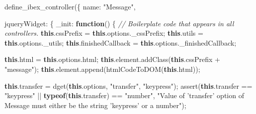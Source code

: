 \documentclass[]{article}
\newenvironment{Shaded}{}{}
\newcommand{\KeywordTok}[1]{\textcolor[rgb]{0.00,0.44,0.13}{\textbf{{#1}}}}
\newcommand{\DataTypeTok}[1]{\textcolor[rgb]{0.56,0.13,0.00}{{#1}}}
\newcommand{\StringTok}[1]{\textcolor[rgb]{0.25,0.44,0.63}{{#1}}}
\newcommand{\CommentTok}[1]{\textcolor[rgb]{0.38,0.63,0.69}{\textit{{#1}}}}
\newcommand{\OtherTok}[1]{\textcolor[rgb]{0.00,0.44,0.13}{{#1}}}
\newcommand{\FunctionTok}[1]{\textcolor[rgb]{0.02,0.16,0.49}{{#1}}}
\newcommand{\NormalTok}[1]{{#1}}
\begin{document}
\begin{Shaded}
\begin{Highlighting}[]
\FunctionTok{define_ibex_controller}\NormalTok{(\{}
\DataTypeTok{name}\NormalTok{: }\StringTok{"Message"}\NormalTok{,}

\DataTypeTok{jqueryWidget}\NormalTok{: \{}
    \DataTypeTok{_init}\NormalTok{: }\KeywordTok{function}\NormalTok{() \{}
        \CommentTok{// Boilerplate code that appears in all controllers.}
        \KeywordTok{this}\NormalTok{.}\FunctionTok{cssPrefix} \NormalTok{= }\KeywordTok{this}\NormalTok{.}\OtherTok{options}\NormalTok{.}\FunctionTok{_cssPrefix}\NormalTok{;}
        \KeywordTok{this}\NormalTok{.}\FunctionTok{utils} \NormalTok{= }\KeywordTok{this}\NormalTok{.}\OtherTok{options}\NormalTok{.}\FunctionTok{_utils}\NormalTok{;}
        \KeywordTok{this}\NormalTok{.}\FunctionTok{finishedCallback} \NormalTok{= }\KeywordTok{this}\NormalTok{.}\OtherTok{options}\NormalTok{.}\FunctionTok{_finishedCallback}\NormalTok{;}

        \KeywordTok{this}\NormalTok{.}\FunctionTok{html} \NormalTok{= }\KeywordTok{this}\NormalTok{.}\OtherTok{options}\NormalTok{.}\FunctionTok{html}\NormalTok{;}
        \KeywordTok{this}\NormalTok{.}\OtherTok{element}\NormalTok{.}\FunctionTok{addClass}\NormalTok{(}\KeywordTok{this}\NormalTok{.}\FunctionTok{cssPrefix} \NormalTok{+ }\StringTok{"message"}\NormalTok{);}
        \KeywordTok{this}\NormalTok{.}\OtherTok{element}\NormalTok{.}\FunctionTok{append}\NormalTok{(}\FunctionTok{htmlCodeToDOM}\NormalTok{(}\KeywordTok{this}\NormalTok{.}\FunctionTok{html}\NormalTok{));}

        \KeywordTok{this}\NormalTok{.}\FunctionTok{transfer} \NormalTok{= }\FunctionTok{dget}\NormalTok{(}\KeywordTok{this}\NormalTok{.}\FunctionTok{options}\NormalTok{, }\StringTok{"transfer"}\NormalTok{, }\StringTok{"keypress"}\NormalTok{);}
        \FunctionTok{assert}\NormalTok{(}\KeywordTok{this}\NormalTok{.}\FunctionTok{transfer} \NormalTok{== }\StringTok{"keypress"} \NormalTok{|| }\KeywordTok{typeof}\NormalTok{(}\KeywordTok{this}\NormalTok{.}\FunctionTok{transfer}\NormalTok{) == }\StringTok{"number"}\NormalTok{,}
               \StringTok{"Value of 'transfer' option of Message must either be the string 'keypress' or a number"}\NormalTok{);}


\end{Highlighting}
\end{Shaded}
\end{document}

